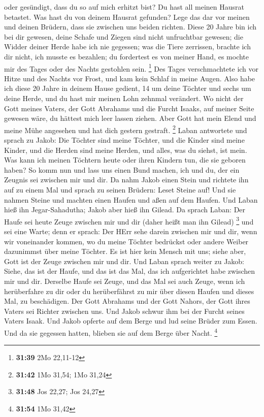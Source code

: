 oder gesündigt, dass du so auf mich erhitzt bist?  Du hast
all meinen Hausrat betastet. Was hast du von deinem Hausrat gefunden?
Lege das dar vor meinen und deinen Brüdern, dass sie zwischen uns beiden
richten.  Diese 20 Jahre bin ich bei dir gewesen, deine
Schafe und Ziegen sind nicht unfruchtbar gewesen; die Widder deiner
Herde habe ich nie gegessen;  was die Tiere zerrissen,
brachte ich dir nicht, ich musste es bezahlen; du fordertest es von
meiner Hand, es mochte mir des Tages oder des Nachts gestohlen sein.
\footnote{\textbf{31:39} 2Mo 22,11-12}  Des Tages
verschmachtete ich vor Hitze und des Nachts vor Frost, und kam kein
Schlaf in meine Augen.  Also habe ich diese 20 Jahre in
deinem Hause gedient, 14 um deine Töchter und sechs um deine Herde, und
du hast mir meinen Lohn zehnmal verändert.  Wo nicht der
Gott meines Vaters, der Gott Abrahams und die Furcht Isaaks, auf meiner
Seite gewesen wäre, du hättest mich leer lassen ziehen. Aber Gott hat
mein Elend und meine Mühe angesehen und hat dich gestern gestraft.
\footnote{\textbf{31:42} 1Mo 31,54; 1Mo 31,24}  Laban
antwortete und sprach zu Jakob: Die Töchter sind meine Töchter, und die
Kinder sind meine Kinder, und die Herden sind meine Herden, und alles,
was du siehst, ist mein. Was kann ich meinen Töchtern heute oder ihren
Kindern tun, die sie geboren haben?  So komm nun und lass
uns einen Bund machen, ich und du, der ein Zeugnis sei zwischen mir und
dir.  Da nahm Jakob einen Stein und richtete ihn auf zu
einem Mal  und sprach zu seinen Brüdern: Leset Steine auf!
Und sie nahmen Steine und machten einen Haufen und aßen auf dem Haufen.
 Und Laban hieß ihn Jegar-Sahadutha; Jakob aber hieß ihn
Gilead.  Da sprach Laban: Der Haufe sei heute Zeuge
zwischen mir und dir (daher heißt man ihn Gilead) \footnote{\textbf{31:48}
  Jos 22,27; Jos 24,27}  und sei eine Warte; denn er
sprach: Der HErr sehe darein zwischen mir und dir, wenn wir voneinander
kommen,  wo du meine Töchter bedrückst oder andere Weiber
dazunimmst über meine Töchter. Es ist hier kein Mensch mit uns; siehe
aber, Gott ist der Zeuge zwischen mir und dir.  Und Laban
sprach weiter zu Jakob: Siehe, das ist der Haufe, und das ist das Mal,
das ich aufgerichtet habe zwischen mir und dir.  Derselbe
Haufe sei Zeuge, und das Mal sei auch Zeuge, wenn ich herüberfahre zu
dir oder du herüberfährst zu mir über diesen Haufen und dieses Mal, zu
beschädigen.  Der Gott Abrahams und der Gott Nahors, der
Gott ihres Vaters sei Richter zwischen uns.  Und Jakob
schwur ihm bei der Furcht seines Vaters Isaak. Und Jakob opferte auf dem
Berge und lud seine Brüder zum Essen. Und da sie gegessen hatten,
blieben sie auf dem Berge über Nacht. \footnote{\textbf{31:54} 1Mo 31,42}

